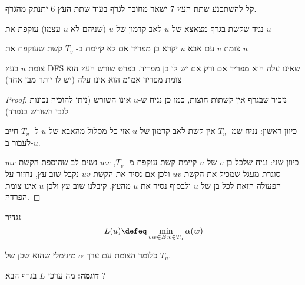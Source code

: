 קל להשתכנע שתת העץ 7 ישאר מחובר לגרף בעוד שתת העץ 6 יתנתק מהגרף.
\begin{definition}
נגיד שקשת בגרף מצאצא של $u$ לאב קדמון של $u$ (שניהם לא $u$ עצמו) עוקפת את $u$
\end{definition}

\begin{definition}[בן מפריד]
צומת $v$ עם אבא $u$ יקרא בן מפריד אם לא קיימת ב-%
$T_v$
קשת שעוקפת את $u$
\end{definition}
\begin{claim}
צומת $u$ בעץ DFS שאינו עלה הוא מפריד אם ורק אם  יש לו בן מפריד.
בפרט שורש העץ הוא צומת מפריד אמ"מ הוא אינו עלה (יש לו יותר מבן אחד)
\end{claim}
\begin{proof}
נזכיר שבגרף אין קשתות חוצות, כמו כן נניח ש-$u$ אינו השורש (ניתן להוכיח נכונות לגבי השורש בנפרד)

כיוון ראשון: נניח שמ-%
$T_v$
אין קשת לאב קדמון של $u$ אזי כל מסלול מהאבא של $u$ ל-%
$T_v$
חייב לעבור ב-$u$.

כיוון שני: נניח שלכל בן $v$ של $u$ קיימת קשת עוקפת מ-%
$T_v$,
$wx$
נשים לב שהוספת הקשת $wx$ סוגרת מעגל שמכיל את הקשת $uv$ ולכן אם נסיר את הקשת $uv$
נקבל שוב עץ, נחזור על הפעולה הזאת לכל בן של $u$ ולבסוף נסיר את $u$ מהעץ. 
קיבלנו שוב עץ ולכן $u$ אינו צומת הפרדה.

\end{proof}

\begin{definition}
נגדיר
$$
L(u) \defeq \min_{vw \in E: v \in T_u} \alpha(w)
$$
\end{definition}
כלומר הצומת עם ערך $\alpha$ מינימלי שהוא שכן של 
$T_u$.

\textbf{דוגמה:}
מה ערכי $L$ בגרף הבא ?
\begin{center}
\end{center}

